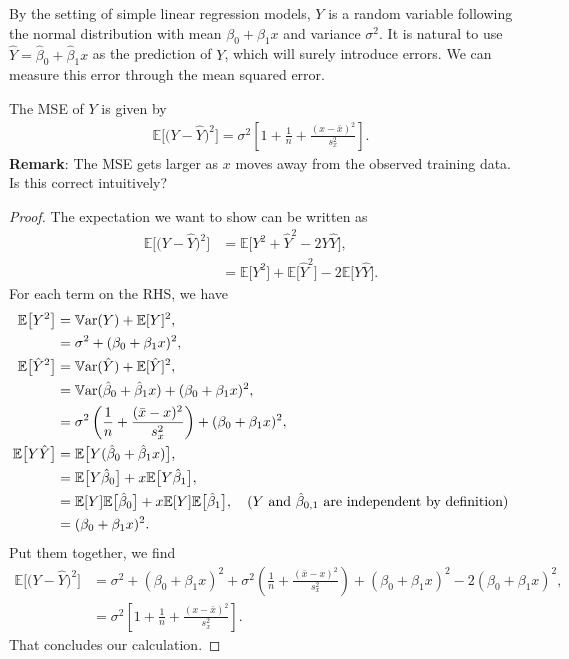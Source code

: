 \documentclass{book}
\begin{document}
By the setting of  simple linear regression models, $Y$ is a random variable following the normal distribution with mean $\beta_0 + \beta_1 x$ and variance $\sigma^2$. It is natural to use $\hat{Y} = \hat{\beta}_0 + \hat{\beta}_1 x$ as the prediction of $Y$, which will surely introduce errors. We can measure this error through the mean squared error.

\theorem The MSE of $Y$ is given by
\begin{align}
    \mathbb{E}\Big[\big(Y - \hat{Y}\big)^2\Big] = \sigma^2
    \left[
    1 + \frac{1}{n} +\frac{(x - \bar{x})^2}{s_x^2}
    \right].
\end{align}
\noindent \textbf{Remark}: The MSE gets larger as $x$ moves away from the observed training data. Is this correct intuitively?
\begin{proof}
The expectation we want to show can be written as
\begin{align*}
    \mathbb{E}\Big[\big(Y - \hat{Y}\big)^2\Big] &= \mathbb{E}\big[Y^2 + \hat{Y}^2 - 2 Y \hat{Y} \big],\\
    &= \mathbb{E}\big[Y^2\big] + \mathbb{E}\big[\hat{Y}^2\big] - 2 \mathbb{E}\big[Y \hat{Y} \big].
\end{align*}
For each term on the RHS, we have
\begin{align*}
    \mathbb{E}\big[Y^2\big] &= \operatorname{\mathbb Var}(Y) + \mathbb{E}[Y]^2,\\
    &= \sigma^2 + (\beta_0 + \beta_1 x)^2,\\
    \mathbb{E}\big[\hat{Y}^2\big] &=  \operatorname{\mathbb Var}(\hat{Y}) + \mathbb{E}[\hat{Y}]^2,\\
    &= \operatorname{\mathbb Var}(\hat{\beta}_0 + \hat{\beta}_1 x) + (\beta_0 + \beta_1 x)^2,\\
    &= \sigma^2\left(\frac{1}{n} + \frac{(\bar{x} - x)^2}{s_x^2}\right) + (\beta_0 + \beta_1 x)^2,\\
    \mathbb{E}\big[Y \hat{Y} \big] &= \mathbb{E}\big[Y (\hat{\beta}_0 + \hat{\beta}_1 x) \big],\\
    &= \mathbb{E}\big[Y \hat{\beta}_0\big] + x \mathbb{E}\big[ Y \hat{\beta}_1 \big],\\
    &= \mathbb{E}[Y] \mathbb{E}\big[\hat{\beta}_0\big] + x \mathbb{E}[Y] \mathbb{E}\big[\hat{\beta}_1 \big],\quad (Y\text{ and }\hat\beta_{0,1}\text{ are independent by definition})\\
    &= (\beta_0 + \beta_1 x)^2.
\end{align*}
Put them together, we find
\begin{align*}
    \mathbb{E}\Big[\big(Y - \hat{Y}\big)^2\Big] &= \sigma^2 + (\beta_0 + \beta_1 x)^2 + \sigma^2\left(\frac{1}{n} + \frac{(\bar{x} - x)^2}{s_x^2}\right) + (\beta_0 + \beta_1 x)^2 - 2 (\beta_0 + \beta_1 x)^2,\\
    &= \sigma^2
    \left[
    1 + \frac{1}{n} +\frac{(x - \bar{x})^2}{s_x^2}
    \right].
\end{align*}
That concludes our calculation.
\end{proof}
\end{document}
